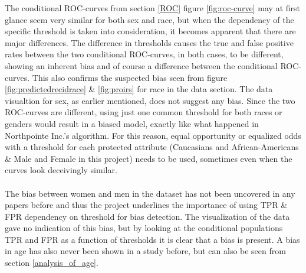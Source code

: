 \documentclass[11pt, fleqn, titlepage]{article}
\begin{document}
	The conditional ROC-curves from section \ref{ROC} figure \ref{fig:roc-curve} may at first glance seem very similar for both sex and race, but when the dependency of the specific threshold is taken into consideration, it becomes apparent that there are major differences. The difference in thresholds causes the true and false positive rates between the two conditional ROC-curves, in both cases, to be different, showing an inherent bias and of course a difference between the conditional ROC-curves. This also confirms the suspected bias seen from figure \ref{fig:predictedrecidrace} \& \ref{fig:proirs} for race in the data section. The data visualtion for sex, as earlier mentioned, does not suggest any bias. Since the two ROC-curves are different, using just one common threshold for both races or genders would result in a biased model, exactly like what happened in Northpointe Inc.'s algorithm. For this reason, equal opportunity or equalized odds with a threshold for each protected attribute (Caucasians and African-Americans \& Male and Female in this project) needs to be used, sometimes even when the curves look deceivingly similar. \\\\
	\noindent
	The bias between women and men in the dataset has not been uncovered in any papers before and thus the project underlines the importance of using TPR \& FPR dependency on threshold for bias detection. The visualization of the data gave no indication of this bias, but by looking at the conditional populations TPR and FPR as a function of thresholds it is clear that a bias is present. A bias in age has also never been shown in a study before, but can also be seen from section \ref{analysis_of_age}.\\\\ 
	\noindent
\end{document}
